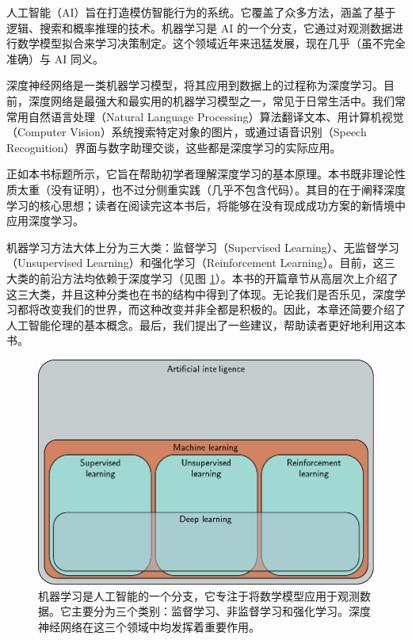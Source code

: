 \documentclass[lang=cn,newtx,10pt,scheme=chinese]{elegantbook}
\begin{document}
人工智能（AI）旨在打造模仿智能行为的系统。它覆盖了众多方法，涵盖了基于逻辑、搜索和概率推理的技术。机器学习是 AI 的一个分支，它通过对观测数据进行数学模型拟合来学习决策制定。这个领域近年来迅猛发展，现在几乎（虽不完全准确）与 AI 同义。

深度神经网络是一类机器学习模型，将其应用到数据上的过程称为深度学习。目前，深度网络是最强大和最实用的机器学习模型之一，常见于日常生活中。我们常常用自然语言处理（Natural Language Processing）算法翻译文本、用计算机视觉（Computer Vision）系统搜索特定对象的图片，或通过语音识别（Speech Recognition）界面与数字助理交谈，这些都是深度学习的实际应用。

正如本书标题所示，它旨在帮助初学者理解深度学习的基本原理。本书既非理论性质太重（没有证明），也不过分侧重实践（几乎不包含代码）。其目的在于阐释深度学习的核心思想；读者在阅读完这本书后，将能够在没有现成成功方案的新情境中应用深度学习。

机器学习方法大体上分为三大类：监督学习（Supervised Learning）、无监督学习（Unsupervised Learning）和强化学习（Reinforcement Learning）。目前，这三大类的前沿方法均依赖于深度学习（见图 \ref{IntroOverview}）。本书的开篇章节从高层次上介绍了这三大类，并且这种分类也在书的结构中得到了体现。无论我们是否乐见，深度学习都将改变我们的世界，而这种改变并非全都是积极的。因此，本章还简要介绍了人工智能伦理的基本概念。最后，我们提出了一些建议，帮助读者更好地利用这本书。

\begin{figure}[ht!]
	\centering
	\includegraphics[width=\linewidth]{PDFFigures/UDLChap1PDF/IntroOverview.pdf}
	\caption{机器学习是人工智能的一个分支，它专注于将数学模型应用于观测数据。它主要分为三个类别：监督学习、非监督学习和强化学习。深度神经网络在这三个领域中均发挥着重要作用。}
  \label{IntroOverview}
\end{figure}
\end{document}
